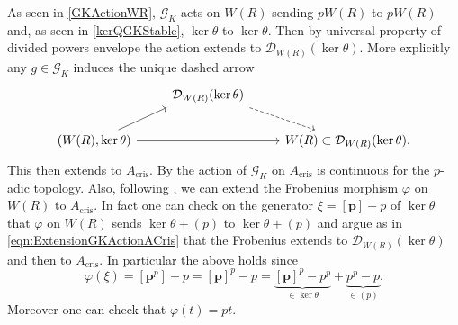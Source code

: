 \begin{rem}[]
	As seen in \cref{GKActionWR}, $\mathscr{G}_K$ acts on $W(R)$ sending $pW(R)$ to $pW(R)$
	and, as seen in \cref{kerQGKStable}, $\ker\theta$ to $\ker\theta$.
	Then by universal property of divided powers envelope the action extends to
	$\mathcal{D}_{W(R)}(\ker\theta)$.
	More explicitly any $g \in \mathscr{G}_K$ induces the unique dashed arrow
	\begin{equation}\label{eqn:ExtensionGKActionACris}
	\begin{tikzcd}
		&
		\mathcal{D}_{W(R)}(\ker\theta)
		\arrow[rd, "", dashrightarrow,
		start anchor=south east] & \\
		\left(W(R), \ker\theta\right) \arrow[ru, "", rightarrow,
		end anchor=south west] 
		\arrow[rr, "", rightarrow] & &
		W(R) \subset \mathcal{D}_{W(R)}(\ker\theta) 
	.\end{tikzcd}
	\end{equation}
	This then extends to $A_{\mathrm{cris}}$.
	By {\cite[Proposition 9.1.2]{Brinon}} the action
	of $\mathscr{G}_K$ on $A_{\mathrm{cris}}$ is continuous
	for the $p$-adic topology.
	Also, following {\cite[Lemmas 9.1.7-9.1.8]{Brinon}},
	we can extend the Frobenius morphism $\varphi$ on $W(R)$ to 
	$A_{\mathrm{cris}}$.
	In fact one can check on the generator $\xi = [\mathbf{p}] - p$
	of $\ker \theta$ that $\varphi$ on $W(R)$ sends $\ker\theta + (p)$ to
	$\ker\theta + (p)$ and argue as in \cref{eqn:ExtensionGKActionACris}
	that the Frobenius extends to $\mathcal{D}_{W(R)}(\ker\theta)$
	and then to $A_{\mathrm{cris}}$.
	In particular the above holds since
	\begin{equation*}
		\varphi(\xi) = [\mathbf{p}^p] - p =
		[\mathbf{p}]^p - p =
		\underbrace{[\mathbf{p}]^p - p^p}_{\in \ker\theta} + 
		\underbrace{p^p - p}_{\in (p)}
	.\end{equation*}
	Moreover one can check that $\varphi(t) = pt$.
\end{rem}


